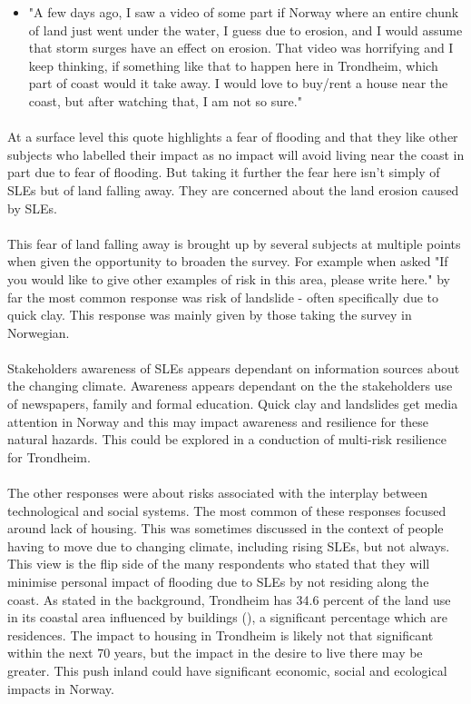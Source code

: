 \begin{itemize}
    \item "A few days ago, I saw a video of some part if Norway where an entire chunk of land just went under the water, I guess due to erosion, and I would assume that storm surges have an effect on erosion. That video was horrifying and I keep thinking, if something like that to happen here in Trondheim, which part of coast would it take away. I would love to buy/rent a house near the coast, but after watching that, I am not so sure."
\end{itemize}
\paragraph{}

At a surface level this quote highlights a fear of flooding and that they like other subjects who labelled their impact as no impact will avoid living near the coast in part due to fear of flooding. But taking it further the fear here isn't simply of SLEs but of land falling away. They are concerned about the land erosion caused by SLEs.
\paragraph{}
This fear of land falling away is brought up by several subjects at multiple points when given the opportunity to broaden the survey. For example when asked "If you would like to give other examples of risk in this area, please write here." by far the most common response was risk of landslide - often specifically due to quick clay. This response was mainly given by those taking the survey in Norwegian. 
\paragraph{}
Stakeholders awareness of SLEs appears dependant on information sources about the changing climate. Awareness appears dependant on the the stakeholders use of newspapers, family and formal education. Quick clay and landslides get media attention in Norway and this may impact awareness and resilience for these natural hazards. This could be explored in a conduction of multi-risk resilience for Trondheim.  
\paragraph{}
The other responses were about risks associated with the interplay between technological and social systems. The most common of these responses focused around lack of housing. This was sometimes discussed in the context of people having to move due to changing climate, including rising SLEs, but not always. This view is the flip side of the many respondents who stated that they will minimise personal impact of flooding due to SLEs by not residing along the coast.  As stated in the background, Trondheim has 34.6 percent of the land use in its coastal area influenced by buildings (\cite{engebakken_construction_2022}), a significant percentage which are residences. The impact to housing in Trondheim is likely not that significant within the next 70 years, but the impact in the desire to live there may be greater. This push inland could have significant economic, social and ecological impacts in Norway. 
